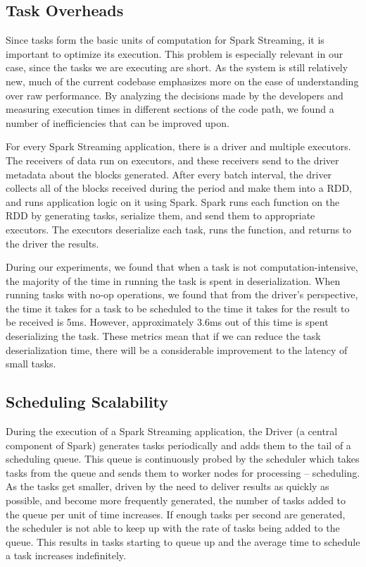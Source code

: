 \subsection{Task Overheads}
Since tasks form the basic units of computation for Spark Streaming, it is important to optimize its execution. This problem is especially relevant in our case, since the tasks we are executing are short. As the system is still relatively new, much of the current codebase emphasizes more on the ease of understanding over raw performance. By analyzing the decisions made by the developers and measuring execution times in different sections of the code path, we found a number of inefficiencies that can be improved upon.

For every Spark Streaming application, there is a driver and multiple executors. The receivers of data run on executors, and these receivers send to the driver metadata about the blocks generated. After every batch interval, the driver collects all of the blocks received during the period and make them into a RDD, and runs application logic on it using Spark. Spark runs each function on the RDD by generating tasks, serialize them, and send them to appropriate executors. The executors deserialize each task, runs the function, and returns to the driver the results.

During our experiments, we found that when a task is not computation-intensive, the majority of the time in running the task is spent in deserialization. When running tasks with no-op operations, we found that from the driver's perspective, the time it takes for a task to be scheduled to the time it takes for the result to be received is 5ms. However, approximately 3.6ms out of this time is spent deserializing the task. These metrics mean that if we can reduce the task deserialization time, there will be a considerable improvement to the latency of small tasks.


\subsection{Scheduling Scalability}

During the execution of a Spark Streaming application, the Driver (a central component of Spark) generates tasks periodically and adds them to the tail of a scheduling queue. This queue is continuously probed by the scheduler which takes tasks from the queue and sends them to worker nodes for processing -- scheduling.
As the tasks get smaller, driven by the need to deliver results as quickly as possible, and become more frequently generated, the number of tasks added to the queue per unit of time increases. If enough tasks per second are generated, the scheduler is not able to keep up with the rate of tasks being added to the queue. This results in tasks starting to queue up and the average time to schedule a task increases indefinitely.

